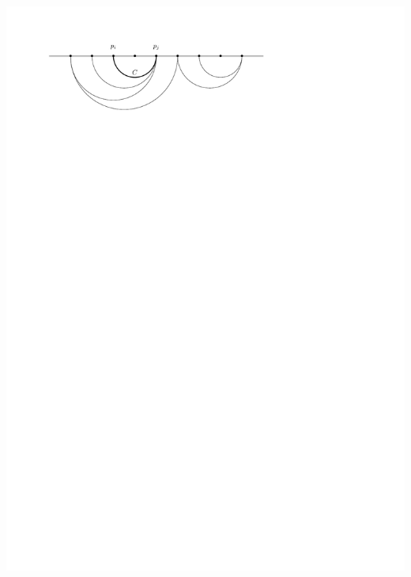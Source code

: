 \documentclass[a4paper]{article}
\begin{document}
\includegraphics[scale=1]{unifiedalgo/img/sweep/chordsOnCandidatePath}
\clearpage%
\end{document}
